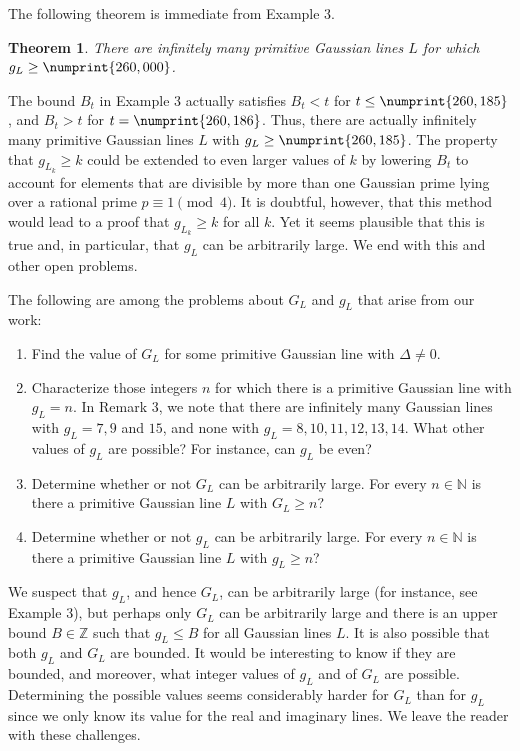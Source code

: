 \documentclass[11pt]{article}
\newtheorem{theorem}{Theorem}
\newcommand{\N}{\mathbb{N}}
\newcommand{\Z}{\mathbb{Z}}
\begin{document}
\bigskip

The following theorem is immediate  from Example 3.

\begin{theorem}\label{biggL} There are infinitely many primitive Gaussian lines $L$ for which $g_L\geq \numprint{260,000}$.  
\end{theorem}

The bound $B_t$ in Example 3 actually satisfies $B_t<t$ for $t\leq\numprint{260,185}$, and $B_t>t$ for $t=\numprint{260,186}$. Thus,  there are actually infinitely many primitive Gaussian lines $L$ with $g_L\geq \numprint{260,185}$.  The property that $g_{L_k}\geq k$ could be extended to even larger values of $k$ by lowering $B_t$ to account for elements that are  divisible by more than one Gaussian prime lying over a rational prime $p\equiv 1\pmod 4$. It is doubtful, however, that this method would lead to a proof that $g_{L_k}\geq k$ for all $k$.  Yet it seems plausible that this is true and, in particular, that $g_L$ can be arbitrarily large.  We end with this and other open problems.

\bigskip

 The following are among the problems about $G_L$ and $g_L$ that arise from our work:
\begin{enumerate}
\item Find the value of $G_L$ for some primitive Gaussian line with $\Delta\neq 0$.
\item Characterize those integers $n$ for which there is a primitive Gaussian line with $g_L=n$.
In Remark 3, we note that there are infinitely many Gaussian lines with  $g_L=7, 9$ and $15$, and none with $g_L=8, 10, 11, 12, 13, 14$.  What other values of $g_L$ are possible?  For instance, can $g_L$ be even? 
\item Determine whether or not $G_L$ can be arbitrarily large. For every $n\in\N$ is there a primitive Gaussian line $L$ with $G_L\geq n$?
\item Determine whether or not $g_L$ can be arbitrarily large. For every $n\in\N$ is there a primitive Gaussian line $L$ with $g_L\geq n$?

\end{enumerate}
We suspect that $g_L$, and hence $G_L$, can be arbitrarily large (for instance, see Example 3), but perhaps only $G_L$ can be arbitrarily large and there is an upper bound $B\in\Z$ such that $g_L\leq B$ for all Gaussian lines $L$.  It is also possible that both $g_L$ and $G_L$ are bounded. It would be interesting to know if they are bounded, and moreover, what integer values of $g_L$ and of $G_L$ are possible. Determining the possible values seems considerably harder for $G_L$ than for $g_L$ since we only know its value for the real and imaginary lines.
We leave the reader with these challenges.
\end{document}
